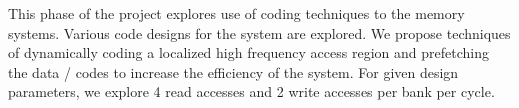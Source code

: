 This phase of the project explores use of coding techniques to the memory systems. Various code designs for the system are explored. We propose techniques of dynamically coding a localized high frequency access region and prefetching the data / codes to increase the efficiency of the system. For given design parameters, we explore 4 read accesses and 2 write accesses per bank per cycle. 
